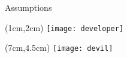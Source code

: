 \begin{frame}{Assumptions}
	\begin{textblock*}{5cm}(1cm,2cm)
		\texttt{[image: developer]}
	\end{textblock*}
	\begin{textblock*}{5cm}(7cm,4.5cm)
		\texttt{[image: devil]}
	\end{textblock*}
\end{frame}